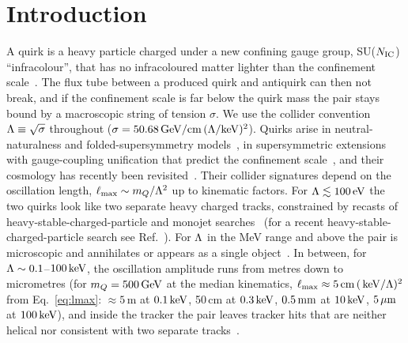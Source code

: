 \section{Introduction}\label{sec:intro}

A quirk is a heavy particle charged under a new confining gauge group, SU($N_{\rm IC}$) ``infracolour'', that has no
infracoloured matter lighter than the confinement scale~\cite{Okun:1980mu,Kang:2008ea}. The flux tube between a
produced quirk and antiquirk can then not break, and if the confinement scale is far below the quirk mass the pair stays
bound by a macroscopic string of tension $\sigma$. We use the collider convention $\Lambda\equiv\sqrt\sigma$ throughout
($\sigma=50.68\,\mathrm{GeV}/\mathrm{cm}\,(\Lambda/\mathrm{keV})^2$). Quirks arise in neutral-naturalness and folded-supersymmetry
models~\cite{Burdman:2008ek}, in supersymmetric extensions with gauge-coupling unification that predict the confinement
scale~\cite{Martin:2010kk}, and their cosmology has recently been revisited~\cite{Asadi:2025btr}. Their collider
signatures depend on the oscillation length, $\ell_{\max}\sim m_Q/\Lambda^2$ up to kinematic factors. For $\Lambda\lesssim100\,\mathrm{eV}$ the
two quirks look like two separate heavy charged tracks, constrained by recasts of heavy-stable-charged-particle and
monojet searches~\cite{Farina:2017cts} (for a recent heavy-stable-charged-particle search see
Ref.~\cite{CMS:2024nhn}). For $\Lambda$ in the MeV range and above the pair is microscopic and annihilates or
appears as a single object~\cite{Kang:2008ea,Harnik:2008ax,Harnik:2011mv}. In between, for $\Lambda\sim0.1$--$100\,\mathrm{keV}$,
the oscillation amplitude runs from metres down to micrometres (for $m_Q=500\,\mathrm{GeV}$ at the median kinematics,
$\ell_{\max}\approx5\,\mathrm{cm}\,(\,\mathrm{keV}/\Lambda)^2$ from Eq.~\eqref{eq:lmax}: $\approx5$\,m at $0.1\,\mathrm{keV}$, 50\,cm at $0.3\,\mathrm{keV}$,
$0.5\,\mathrm{mm}$ at $10\,\mathrm{keV}$, $5\,\mu\mathrm{m}$ at $100\,\mathrm{keV}$), and inside the tracker the pair leaves tracker hits that are neither
helical nor consistent with two separate tracks~\cite{Kang:2008ea,Knapen:2017kly}.

